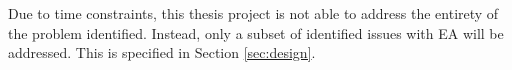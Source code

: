 Due to time constraints, this thesis project is not able to address the entirety of the problem identified. Instead, only a subset of identified issues with EA will be addressed. This is specified in Section \ref{sec:design}.